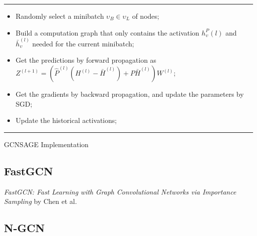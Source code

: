 \begin{table}[H]
    \centering
    \noindent\rule{.7\textwidth}{1pt}

    \medskip

    \begin{varwidth}{.7\textwidth}
        \begin{itemize}
            \item Randomly select a minibatch $\upsilon_B\in \upsilon_L$ of nodes;
            \item Build a computation graph that only contains the activation $h_{\upsilon}^P(l)$ and $\bar{h}_{\upsilon}^{(l)}$ needed for the current minibatch;
            \item Get the predictions by forward propagation as $Z^{(l+1)} = \left(\hat{P}^{(l)}(H^{(l)} - \bar{H}^{(l)}) + P\bar{H}^{(l)}\right)W^{(l)}$;
            \item Get the gradients by backward propagation, and update the parameters by SGD;
            \item Update the historical activations;
        \end{itemize}
    \end{varwidth}
    
    \medskip
    
    \noindent\rule{.7\textwidth}{1pt}

    \caption{GCNSAGE Implementation}
    \label{implementation-gcnsage}
\end{table}

\subsection{FastGCN}

\textit{FastGCN: Fast Learning with Graph Convolutional Networks via Importance Sampling} by Chen et al.\cite{DBLP:journals/corr/abs-1801-10247}

\subsection{N-GCN}

\cite{DBLP:journals/corr/abs-1802-08888}
